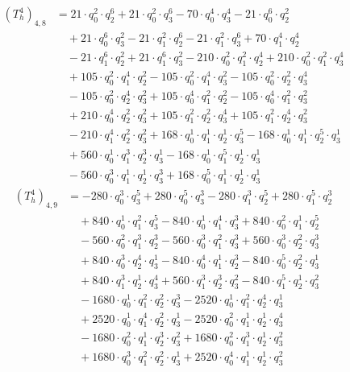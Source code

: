 \begin{align*}(T_{h}^4)_{4,8}&=21\cdot q_0^{2}\cdot q_2^{6}+21\cdot q_0^{2}\cdot q_3^{6}-70\cdot q_0^{4}\cdot q_3^{4}-21\cdot q_0^{6}\cdot q_2^{2}\\
&\quad +21\cdot q_0^{6}\cdot q_3^{2}-21\cdot q_1^{2}\cdot q_2^{6}-21\cdot q_1^{2}\cdot q_3^{6}+70\cdot q_1^{4}\cdot q_2^{4}\\
&\quad -21\cdot q_1^{6}\cdot q_2^{2}+21\cdot q_1^{6}\cdot q_3^{2}-210\cdot q_0^{2}\cdot q_1^{2}\cdot q_2^{4}+210\cdot q_0^{2}\cdot q_1^{2}\cdot q_3^{4}\\
&\quad +105\cdot q_0^{2}\cdot q_1^{4}\cdot q_2^{2}-105\cdot q_0^{2}\cdot q_1^{4}\cdot q_3^{2}-105\cdot q_0^{2}\cdot q_2^{2}\cdot q_3^{4}\\
&\quad -105\cdot q_0^{2}\cdot q_2^{4}\cdot q_3^{2}+105\cdot q_0^{4}\cdot q_1^{2}\cdot q_2^{2}-105\cdot q_0^{4}\cdot q_1^{2}\cdot q_3^{2}\\
&\quad +210\cdot q_0^{4}\cdot q_2^{2}\cdot q_3^{2}+105\cdot q_1^{2}\cdot q_2^{2}\cdot q_3^{4}+105\cdot q_1^{2}\cdot q_2^{4}\cdot q_3^{2}\\
&\quad -210\cdot q_1^{4}\cdot q_2^{2}\cdot q_3^{2}+168\cdot q_0^{1}\cdot q_1^{1}\cdot q_2^{1}\cdot q_3^{5}-168\cdot q_0^{1}\cdot q_1^{1}\cdot q_2^{5}\cdot q_3^{1}\\
&\quad +560\cdot q_0^{1}\cdot q_1^{3}\cdot q_2^{3}\cdot q_3^{1}-168\cdot q_0^{1}\cdot q_1^{5}\cdot q_2^{1}\cdot q_3^{1}\\
&\quad -560\cdot q_0^{3}\cdot q_1^{1}\cdot q_2^{1}\cdot q_3^{3}+168\cdot q_0^{5}\cdot q_1^{1}\cdot q_2^{1}\cdot q_3^{1}\end{align*}
\begin{align*}(T_{h}^4)_{4,9}&=-280\cdot q_0^{3}\cdot q_3^{5}+280\cdot q_0^{5}\cdot q_3^{3}-280\cdot q_1^{3}\cdot q_2^{5}+280\cdot q_1^{5}\cdot q_2^{3}\\
&\quad +840\cdot q_0^{1}\cdot q_1^{2}\cdot q_3^{5}-840\cdot q_0^{1}\cdot q_1^{4}\cdot q_3^{3}+840\cdot q_0^{2}\cdot q_1^{1}\cdot q_2^{5}\\
&\quad -560\cdot q_0^{2}\cdot q_1^{3}\cdot q_2^{3}-560\cdot q_0^{3}\cdot q_1^{2}\cdot q_3^{3}+560\cdot q_0^{3}\cdot q_2^{2}\cdot q_3^{3}\\
&\quad +840\cdot q_0^{3}\cdot q_2^{4}\cdot q_3^{1}-840\cdot q_0^{4}\cdot q_1^{1}\cdot q_2^{3}-840\cdot q_0^{5}\cdot q_2^{2}\cdot q_3^{1}\\
&\quad +840\cdot q_1^{3}\cdot q_2^{1}\cdot q_3^{4}+560\cdot q_1^{3}\cdot q_2^{3}\cdot q_3^{2}-840\cdot q_1^{5}\cdot q_2^{1}\cdot q_3^{2}\\
&\quad -1680\cdot q_0^{1}\cdot q_1^{2}\cdot q_2^{2}\cdot q_3^{3}-2520\cdot q_0^{1}\cdot q_1^{2}\cdot q_2^{4}\cdot q_3^{1}\\
&\quad +2520\cdot q_0^{1}\cdot q_1^{4}\cdot q_2^{2}\cdot q_3^{1}-2520\cdot q_0^{2}\cdot q_1^{1}\cdot q_2^{1}\cdot q_3^{4}\\
&\quad -1680\cdot q_0^{2}\cdot q_1^{1}\cdot q_2^{3}\cdot q_3^{2}+1680\cdot q_0^{2}\cdot q_1^{3}\cdot q_2^{1}\cdot q_3^{2}\\
&\quad +1680\cdot q_0^{3}\cdot q_1^{2}\cdot q_2^{2}\cdot q_3^{1}+2520\cdot q_0^{4}\cdot q_1^{1}\cdot q_2^{1}\cdot q_3^{2}\end{align*}
